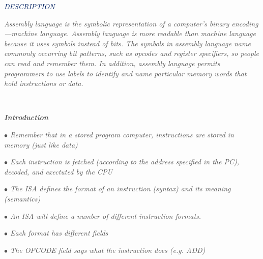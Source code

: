 \documentclass[12pt]{article}
\begin{document}
\vspace{\baselineskip}

\vspace{\baselineskip}

\vspace{\baselineskip}

\vspace{\baselineskip}
{\fontsize{36pt}{43.2pt}\selectfont \textit{\textcolor[HTML]{002060}{DESCRIPTION}}\par}\par


\vspace{\baselineskip}
\textit{\textcolor[HTML]{525252}{Assembly language is the symbolic representation of a computer’s binary encoding—machine language. Assembly language is more readable than machine language because it uses symbols instead of bits. The symbols in assembly language name commonly occurring bit patterns, such as opcodes and register specifiers, so people can read and remember them. In addition, assembly language permits programmers to use labels to identify and name particular memory words that hold instructions or data.}}\par

\textit{\textcolor[HTML]{525252}{\ \  }}{\fontsize{16pt}{19.2pt}\selectfont \textbf{\textit{\textcolor[HTML]{525252}{Introduction}}}\par}\par

\textit{\textcolor[HTML]{525252}{$\bullet$  Remember that in a stored program computer, instructions are stored in memory (just like data) }}\par

\textit{\textcolor[HTML]{525252}{$\bullet$  Each instruction is fetched (according to the address specified in the PC), decoded, and exectuted by the CPU}}\par

\textit{\textcolor[HTML]{525252}{ $\bullet$  The ISA defines the format of an instruction (syntax) and its meaning (semantics)}}\par

\textit{\textcolor[HTML]{525252}{ $\bullet$  An ISA will define a number of different instruction formats. }}\par

\textit{\textcolor[HTML]{525252}{$\bullet$  Each format has different fields }}\par

\textit{\textcolor[HTML]{525252}{$\bullet$  The OPCODE field says what the instruction does (e.g. ADD)}}\par
\end{document}

